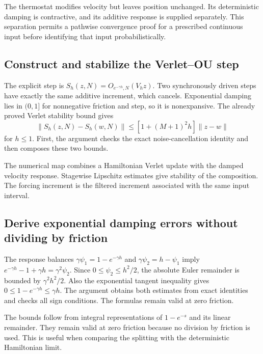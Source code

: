 \documentclass[11pt,a4paper]{report}
\begin{document}
The thermostat modifies velocity but leaves position unchanged. Its deterministic damping is contractive, and its additive response is supplied separately. This separation permits a pathwise convergence proof for a prescribed continuous input before identifying that input probabilistically.

\subsection{\texorpdfstring{Construct and stabilize the Verlet–OU step}{Construct and stabilize the Verlet–OU step}}
\label{report-step-KineticLangevin-KineticSplitting-lean-2}


The explicit step is \(S_h(z,N)=O_{e^{-\gamma h},N}(V_hz)\). Two synchronously driven steps have exactly the same additive increment, which cancels. Exponential damping lies in \((0,1]\) for nonnegative friction and step, so it is nonexpansive. The already proved Verlet stability bound gives \[\|S_h(z,N)-S_h(w,N)\|\le[1+(M+1)^2h]\|z-w\|\] for \(h\le1\). First, the argument checks the exact noise-cancellation identity and then composes these two bounds.



The numerical map combines a Hamiltonian Verlet update with the damped velocity response. Stagewise Lipschitz estimates give stability of the composition. The forcing increment is the filtered increment associated with the same input interval.

\subsection{\texorpdfstring{Derive exponential damping errors without dividing by friction}{Derive exponential damping errors without dividing by friction}}
\label{report-step-KineticLangevin-KineticSplitting-lean-3}


The response balances \(\gamma\psi_1=1-e^{-\gamma h}\) and \(\gamma\psi_2=h-\psi_1\) imply \(e^{-\gamma h}-1+\gamma h=\gamma^2\psi_2\). Since \(0\le\psi_2\le h^2/2\), the absolute Euler remainder is bounded by \(\gamma^2h^2/2\). Also the exponential tangent inequality gives \(0\le1-e^{-\gamma h}\le\gamma h\). The argument obtains both estimates from exact identities and checks all sign conditions. The formulas remain valid at zero friction.



The bounds follow from integral representations of \(1-e^{-s}\) and its linear remainder. They remain valid at zero friction because no division by friction is used. This is useful when comparing the splitting with the deterministic Hamiltonian limit.
\end{document}

